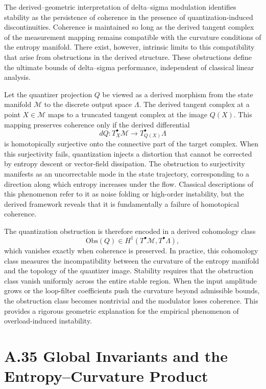 The derived–geometric interpretation of delta–sigma modulation identifies stability as the persistence of coherence in the presence of quantization-induced discontinuities. Coherence is maintained so long as the derived tangent complex of the measurement mapping remains compatible with the curvature conditions of the entropy manifold. There exist, however, intrinsic limits to this compatibility that arise from obstructions in the derived structure. These obstructions define the ultimate bounds of delta–sigma performance, independent of classical linear analysis.

Let the quantizer projection \(Q\) be viewed as a derived morphism from the state manifold \(\mathcal{M}\) to the discrete output space \(\Lambda\). The derived tangent complex at a point \(X\in\mathcal{M}\) maps to a truncated tangent complex at the image \(Q(X)\). This mapping preserves coherence only if the derived differential
\[
dQ : T_X^\bullet\mathcal{M} \longrightarrow T^\bullet_{Q(X)}\Lambda
\]
is homotopically surjective onto the connective part of the target complex. When this surjectivity fails, quantization injects a distortion that cannot be corrected by entropy descent or vector-field dissipation. The obstruction to surjectivity manifests as an uncorrectable mode in the state trajectory, corresponding to a direction along which entropy increases under the flow. Classical descriptions of this phenomenon refer to it as noise folding or high-order instability, but the derived framework reveals that it is fundamentally a failure of homotopical coherence.

The quantization obstruction is therefore encoded in a derived cohomology class
\[
\mathrm{Obs}(Q) \in H^1\left(T^\bullet\mathcal{M}, T^\bullet\Lambda \right),
\]
which vanishes exactly when coherence is preserved. In practice, this cohomology class measures the incompatibility between the curvature of the entropy manifold and the topology of the quantizer image. Stability requires that the obstruction class vanish uniformly across the entire stable region. When the input amplitude grows or the loop-filter coefficients push the curvature beyond admissible bounds, the obstruction class becomes nontrivial and the modulator loses coherence. This provides a rigorous geometric explanation for the empirical phenomenon of overload-induced instability.

\section{A.35 Global Invariants and the Entropy–Curvature Product}

